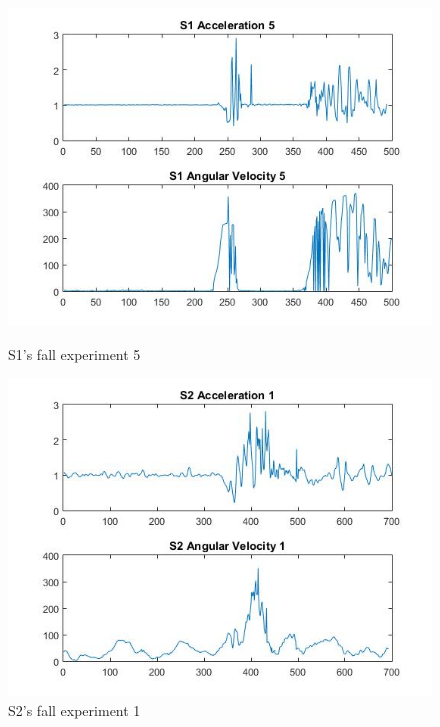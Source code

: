 \documentclass[letterpaper,12pt,titlepage,oneside,final]{book}
\begin{document}
\begin{figure}[h!]
	\centering
	\hspace{-1cm}
	\begin{minipage}[b]{0.5\textwidth}
		\centering
		\includegraphics[scale=0.42]{S1_5}
		\caption{S1's fall experiment 5}
	\end{minipage}%
	\hfill
	\begin{minipage}[b]{0.5\textwidth}
		\centering
		\includegraphics[scale=0.42]{S2_1}
		\caption{S2's fall experiment 1}
	\end{minipage}	
\end{figure}
\end{document}
